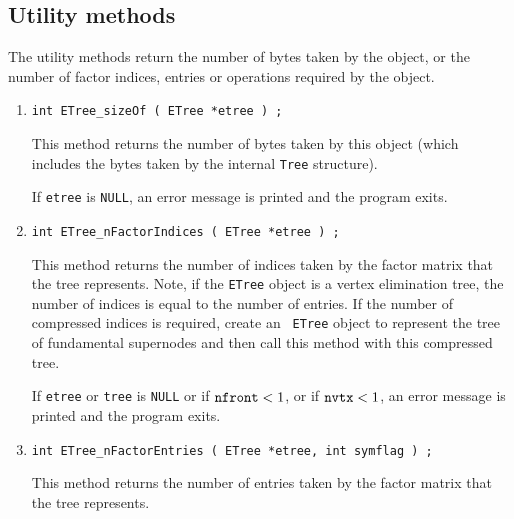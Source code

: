 \subsection{Utility methods}
\label{subsection:ETree:proto:utilities}
\par
The utility methods return the number of bytes taken by the object,
or the number of factor indices, entries or operations required by
the object.
\par
\begin{enumerate}
\item
\begin{verbatim}
int ETree_sizeOf ( ETree *etree ) ;
\end{verbatim}
This method returns the number of bytes taken by this object 
(which includes the bytes taken by the internal {\tt Tree}
structure).
\par {}
If {\tt etree} is {\tt NULL},
an error message is printed and the program exits.
\item
\begin{verbatim}
int ETree_nFactorIndices ( ETree *etree ) ;
\end{verbatim}
This method returns the number of indices taken by the factor matrix 
that the tree represents.
Note, if the {\tt ETree} object is a vertex elimination tree,
the number of indices is equal to the number of entries.
If the number of compressed indices is required, create an {\tt
ETree} object to represent the tree of fundamental supernodes
and then call this method with this compressed tree.
\par {}
If {\tt etree} or {\tt tree} is {\tt NULL} 
or if $\mbox{\tt nfront} < 1$,
or if $\mbox{\tt nvtx} < 1$,
an error message is printed and the program exits.
\item
\begin{verbatim}
int ETree_nFactorEntries ( ETree *etree, int symflag ) ;
\end{verbatim}
This method returns the number of entries taken by the factor matrix 
that the tree represents.

\end{enumerate}
